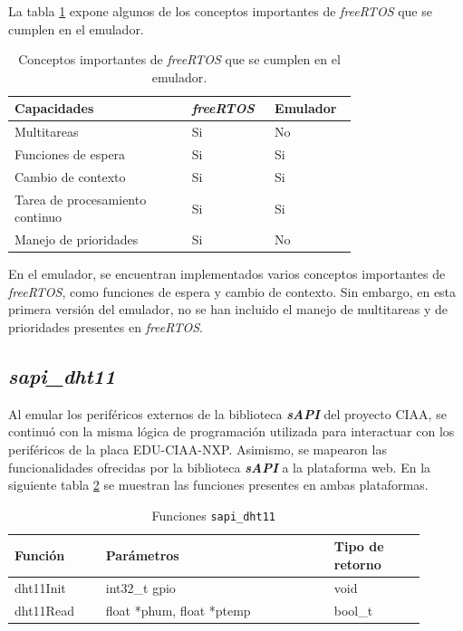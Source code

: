 La tabla \ref{tab:ConceptosRTOS} expone algunos de los conceptos importantes de \textit{freeRTOS} que se cumplen en el emulador.

\begin{table}[h]
\centering
\caption[Conceptos importantes de \textit{freeRTOS} que se cumplen en el emulador.]{Conceptos importantes de \textit{freeRTOS} que se cumplen en el emulador.}
\begin{tabular}{p{0.45\linewidth} p{0.15\linewidth}  p{0.15\linewidth}}
\toprule
\textbf{Capacidades} 
& \textbf{\textit{freeRTOS}}
& \textbf{Emulador}
\\
\midrule
Multitareas & Si & No  \\
Funciones de espera &  Si & Si \\
Cambio de contexto &  Si & Si \\
Tarea de procesamiento continuo &  Si & Si \\
Manejo de prioridades & Si & No  \\
\bottomrule
\hline
\end{tabular}
\label{tab:ConceptosRTOS}
\end{table}

En el emulador, se encuentran implementados varios conceptos importantes de \textit{freeRTOS}, como funciones de espera y cambio de contexto. Sin embargo, en esta primera versión del emulador, no se han incluido el manejo de multitareas y de prioridades presentes en \textit{freeRTOS}.


\subsection{\textit{\textbf{sapi\_dht11}}}

Al emular los periféricos externos de la biblioteca \textit{\textbf{sAPI}} del proyecto CIAA, se continuó con la misma lógica de programación utilizada para interactuar con los periféricos de la placa EDU-CIAA-NXP. Asimismo, se mapearon las funcionalidades ofrecidas por la biblioteca \textit{\textbf{sAPI}} a la plataforma web. En la siguiente tabla \ref{tab:sapiDht11} se muestran las funciones presentes en ambas plataformas.


\begin{table}[h]
	\centering
	\caption[Funciones \texttt{sapi\_dht11}]{Funciones \texttt{sapi\_dht11}}
	\begin{tabular}{p{0.20\linewidth} p{0.50\linewidth}  p{0.20\linewidth}}    
		\toprule
		\textbf{Función} 	 & \textbf{Parámetros} 		& \textbf{Tipo de retorno}  \\
		\midrule
		dht11Init & int32\_t gpio		&  void \\		
		dht11Read	 & float *phum, float *ptemp	&  bool\_t \\
		\bottomrule
		\hline
	\end{tabular}
	\label{tab:sapiDht11}
\end{table}

